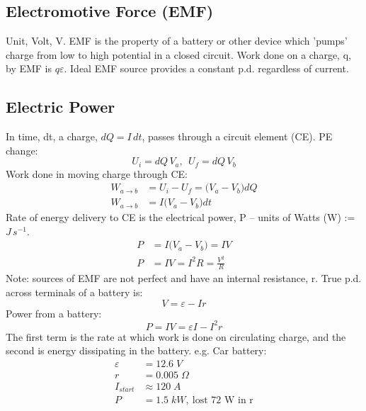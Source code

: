 \documentclass[a4paper, 11pt, normalem]{report}
\begin{document}
\chapter{}
\section{Electromotive Force (EMF)}
Unit, Volt, V.
EMF is the property of a battery or other device which 'pumps' charge from low to high potential in a closed circuit. 
Work done on a charge, q, by EMF is $q\varepsilon$. 
Ideal EMF source provides a constant p.d. regardless of current.

\section{Electric Power}
In time, dt, a charge, $dQ = I\,dt$, passes through a circuit element (CE).
PE change:
\begin{equation}
    U_{i} = dQ\,V_{a}, ~~ U_{f} = dQ\,V_{b}
\end{equation}
Work done in moving charge through CE:
\begin{align}
    W_{a \to b} &= U_{i} - U_{f} = \big(V_{a} - V_{b} \big)dQ \\
    W_{a \to b} &= I\big(V_{a} - V_{b} \big)dt
\end{align}
Rate of energy delivery to CE is the electrical power, P -- units of Watts (W) := $J\,s^{-1}$.
\begin{align}
    P &= I\big(V_{a} - V_{b} \big) = IV \\
    P &= IV = I^{2}R = \frac{V^{2}}{R}
\end{align}
Note: sources of EMF are not perfect and have an internal resistance, r.
True p.d. across terminals of a battery is:
\begin{equation}
    V = \varepsilon - Ir
\end{equation}
Power from a battery:
\begin{equation}
    P = IV = \varepsilon I - I^{2}r
\end{equation}
The first term is the rate at which work is done on circulating charge, and the second is energy dissipating in the battery.
e.g. Car battery:
\begin{align}
    \varepsilon &= 12.6 \; V \\
    r &= 0.005 \; \Omega \\
    I_{start} &\approx 120 \; A \\
    P &= 1.5 \; kW,~\text{lost 72 W in r}
\end{align}
\end{document}
